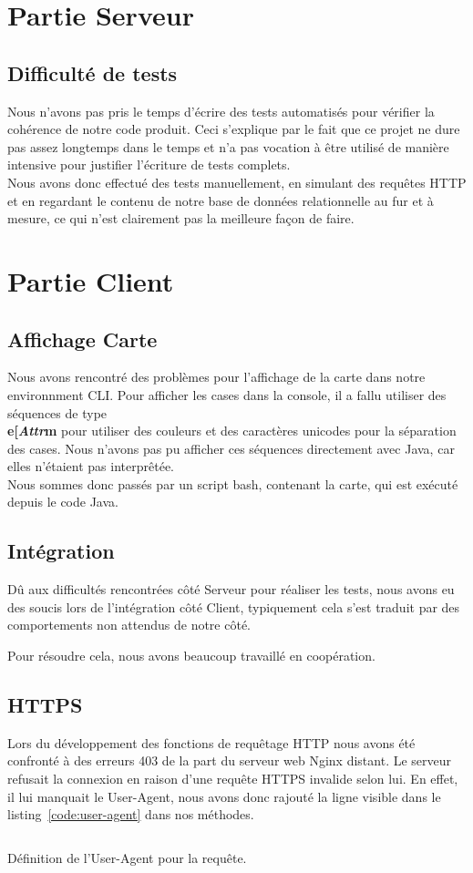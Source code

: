 \section{Partie Serveur}
	\subsection{Difficulté de tests}
		Nous n'avons pas pris le temps d'écrire des tests automatisés pour vérifier la cohérence de notre code produit. Ceci s'explique par le fait que ce projet ne dure pas assez longtemps dans le temps et n'a pas vocation à être utilisé de manière intensive pour justifier l'écriture de tests complets.\\

		Nous avons donc effectué des tests manuellement, en simulant des requêtes HTTP et en regardant le contenu de notre base de données relationnelle au fur et à mesure, ce qui n'est clairement pas la meilleure façon de faire.

\section{Partie Client}
	\subsection{Affichage Carte}
		Nous avons rencontré des problèmes pour l'affichage de la carte dans notre environnment CLI. Pour afficher les cases dans la console, il a fallu utiliser des séquences de type \textbf{\\e[\textit{Attr}m} pour utiliser des couleurs et des caractères unicodes pour la séparation des cases. Nous n'avons pas pu afficher ces séquences directement avec Java, car elles n'étaient pas interprêtée.\\

		Nous sommes donc passés par un script bash, contenant la carte, qui est exécuté depuis le code Java.
	\subsection{Intégration}
		Dû aux difficultés rencontrées côté Serveur pour réaliser les tests, nous avons eu des soucis lors de l'intégration côté Client, typiquement cela s'est traduit par des comportements non attendus de notre côté.

		Pour résoudre cela, nous avons beaucoup travaillé en coopération.
	\subsection{HTTPS}
		Lors du développement des fonctions de requêtage HTTP nous avons été confronté à des erreurs 403 de la part du serveur web Nginx distant. Le serveur refusait la connexion en raison d'une requête HTTPS invalide selon lui. En effet, il lui manquait le User-Agent, nous avons donc rajouté la ligne visible dans le listing~\ref{code:user-agent} dans nos méthodes.

		\begin{code}
			\inputminted[fontsize=\small]{java}{code/user-agent.java}
			\caption{Définition de l'User-Agent pour la requête.}
			\label{code:user-agent}
		\end{code}
